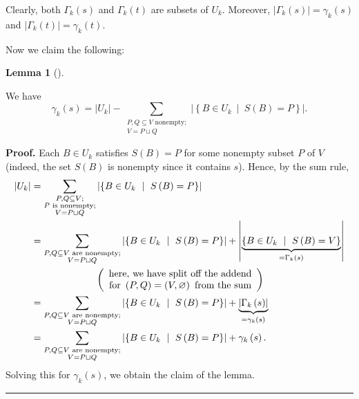 \documentclass[numbers=enddot,12pt,final,onecolumn,notitlepage]{scrartcl}%
\theoremstyle{definition}
\newtheorem{lem}[theo]{Lemma}
\newenvironment{lemma}[1][]
{\begin{lem}[#1]\begin{leftbar}}
{\end{leftbar}\end{lem}}
\newenvironment{proof}[1][Proof]{\noindent\textbf{#1.} }{\ \rule{0.5em}{0.5em}}
\let\sumnonlimits\sum
\renewcommand{\sum}{\sumnonlimits\limits}
\theoremstyle{plainsl}
\begin{document}
Clearly, both $\Gamma_{k}\left(  s\right)  $ and $\Gamma_{k}\left(  t\right)
$ are subsets of $U_{k}$. Moreover, $\left\vert \Gamma_{k}\left(  s\right)
\right\vert =\gamma_{k}\left(  s\right)  $ and $\left\vert \Gamma_{k}\left(
t\right)  \right\vert =\gamma_{k}\left(  t\right)  $.

Now we claim the following:

\begin{lemma}
\label{lem.new1} We have%
\[
\gamma_{k}\left(  s\right)  =\left\vert U_{k}\right\vert -\sum
_{\substack{P,Q\subseteq V\text{ nonempty;}\\V=P\sqcup Q}}\left\vert \left\{
B\in U_{k}\ \mid\ S\left(  B\right)  =P\right\}  \right\vert .
\]

\end{lemma}

\begin{proof}
Each $B\in U_{k}$ satisfies $S\left(  B\right)  =P$ for some nonempty subset
$P$ of $V$ (indeed, the set $S\left(  B\right)  $ is nonempty since it
contains $s$). Hence, by the sum rule,%
\begin{align*}
\left\vert U_{k}\right\vert  &  =\sum_{\substack{P,Q\subseteq V;\\P\text{ is
nonempty;}\\V=P\sqcup Q}}\left\vert \left\{  B\in U_{k}\ \mid\ S\left(
B\right)  =P\right\}  \right\vert \\
&  =\sum_{\substack{P,Q\subseteq V\text{ are nonempty;}\\V=P\sqcup
Q}}\left\vert \left\{  B\in U_{k}\ \mid\ S\left(  B\right)  =P\right\}
\right\vert +\left\vert \underbrace{\left\{  B\in U_{k}\ \mid\ S\left(
B\right)  =V\right\}  }_{=\Gamma_{k}\left(  s\right)  }\right\vert \\
&  \ \ \ \ \ \ \ \ \ \ \ \ \ \ \ \ \ \ \ \ \left(
\begin{array}
[c]{c}%
\text{here, we have split off the addend}\\
\text{for }\left(  P,Q\right)  =\left(  V,\varnothing\right)  \text{ from the
sum}%
\end{array}
\right) \\
&  =\sum_{\substack{P,Q\subseteq V\text{ are nonempty;}\\V=P\sqcup
Q}}\left\vert \left\{  B\in U_{k}\ \mid\ S\left(  B\right)  =P\right\}
\right\vert +\underbrace{\left\vert \Gamma_{k}\left(  s\right)  \right\vert
}_{=\gamma_{k}\left(  s\right)  }\\
&  =\sum_{\substack{P,Q\subseteq V\text{ are nonempty;}\\V=P\sqcup
Q}}\left\vert \left\{  B\in U_{k}\ \mid\ S\left(  B\right)  =P\right\}
\right\vert +\gamma_{k}\left(  s\right)  .
\end{align*}
Solving this for $\gamma_{k}\left(  s\right)  $, we obtain the claim of the lemma.
\end{proof}
\end{document}
